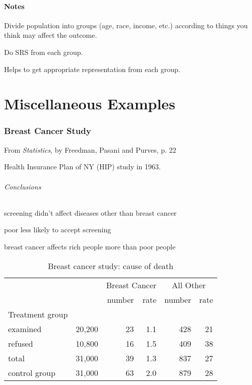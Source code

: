 \documentclass[landscape]{exam}
\begin{document}
  \subsection{Notes}
  \begin{itemize*}
    \item Divide population into groups (age, race, income, etc.) according to
      things you think may affect the outcome.
    \item Do SRS from each group.
    \item Helps to get appropriate representation from each group.
  \end{itemize*}

  \part{Miscellaneous Examples}

  \section{Breast Cancer Study}

  From {\em Statistics}, by Freedman, Pasani and Purves, p. 22

  Health Insurance Plan of NY (HIP) study in 1963.

  \paragraph{Conclusions}
  \begin{itemize*}
    \item screening didn't affect diseases other than breast cancer
    \item poor less likely to accept screening
    \item breast cancer affects rich people more than poor people
  \end{itemize*}

  \begin{table}[H]
    \centering
    \begin{tabular}{lrrrrr}
      & & \multicolumn{2}{c}{Breast Cancer} & \multicolumn{2}{c}{All Other} \\
                               \cmidrule(r){3-4} \cmidrule(r){5-6}    
                      &        & number & rate & number & rate \\
      Treatment group \\
      examined        & 20,200 & 23     & 1.1  & 428    & 21 \\
      refused         & 10,800 & 16     & 1.5  & 409    & 38 \\
      total           & 31,000 & 39     & 1.3  & 837    & 27 \\
    \midrule
      control group   & 31,000 & 63     & 2.0  & 879    & 28 \\
    \end{tabular}
    \caption{Breast cancer study: cause of death}\label{tab:breast.cancer}
  \end{table}
\end{document}
